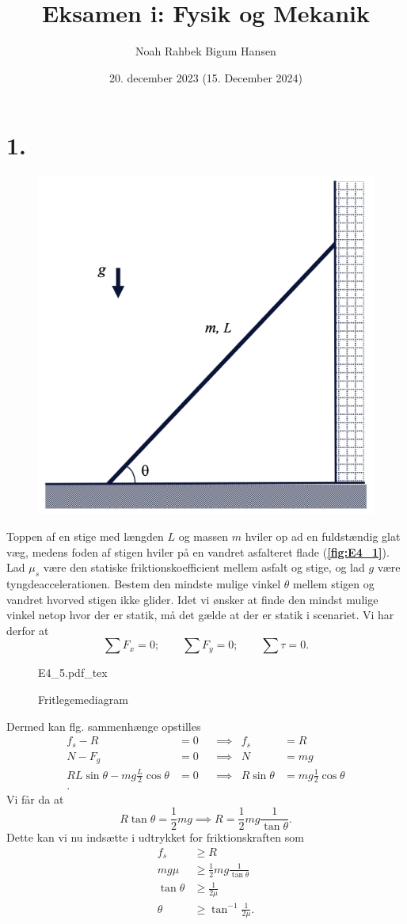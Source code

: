 \documentclass[12pt]{article}
\title{Eksamen i: Fysik og Mekanik}
\author{Noah Rahbek Bigum Hansen}
\date{20. december 2023 (15. December 2024)}
\newcommand{\incfig}[2][1]{%
  \def\svgwidth{#1\columnwidth}
  {#2.pdf_tex}
}
\theoremstyle{definition}
\begin{document}
\maketitle

\section*{1.}
\begin{figure} [ht]
  \centering
  \caption{}
  \includegraphics[width=0.5\linewidth]{../figures/E4_1.png}
  \label{fig:E4_1}
\end{figure}

Toppen af en stige med længden $L$ og massen $m$ hviler op ad en fuldstændig glat væg, medens foden af stigen hviler på en vandret asfalteret flade (\textbf{\autoref{fig:E4_1}}). Lad $\mu_s$ være den statiske friktionskoefficient  mellem  asfalt  og  stige,  og  lad  $g$ være  tyngdeaccelerationen.  Bestem  den  mindste  mulige vinkel $\theta$ mellem stigen og vandret hvorved stigen ikke glider.
\bigbreak
Idet vi ønsker at finde den mindst mulige vinkel netop hvor der er statik, må det gælde at der er statik i scenariet. Vi har derfor at
\[ 
\sum F_{x} = 0; \qquad \sum F_{y} = 0; \qquad \sum\tau = 0
.\]
\begin{figure}[ht]
  \centering
  \incfig[0.35]{E4_5}
  \caption{Fritlegemediagram}
  \label{fig:E4_5}
\end{figure}
Dermed kan flg. sammenhænge opstilles
\begin{align*}
  f_s - R &= 0 & &\implies & f_s &= R \\
  N - F_g &= 0 & &\implies & N &= mg \\
  R L \sin\theta - mg \frac{L}{2} \cos \theta &= 0 & &\implies & R \sin\theta &= mg \frac{1}{2} \cos\theta \\
.\end{align*}
Vi får da at
\[ 
R \tan\theta = \frac{1}{2}mg \implies R = \frac{1}{2}mg \frac{1}{\tan \theta}
.\]
Dette kan vi nu indsætte i udtrykket for friktionskraften som
\begin{align*}
  f_s &\geq R \\
  mg \mu &\geq\frac{1}{2}mg \frac{1}{\tan\theta}\\
  \tan\theta &\geq  \frac{1}{2\mu} \\
  \theta &\geq \tan^{-1} \frac{1}{2\mu}
.\end{align*}
\end{document}
